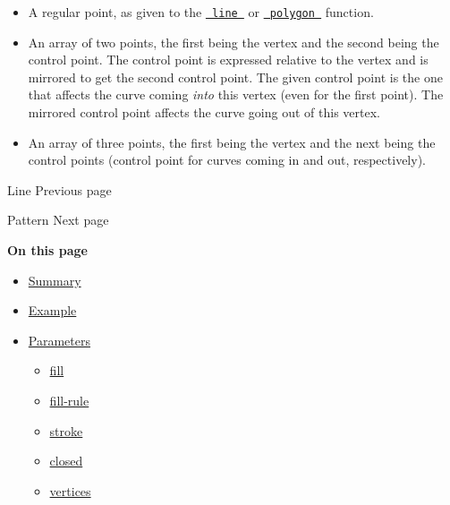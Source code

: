 \begin{itemize}
\tightlist
\item
  A regular point, as given to the
  \href{/docs/reference/visualize/line/}{\texttt{\ line\ }} or
  \href{/docs/reference/visualize/polygon/}{\texttt{\ polygon\ }}
  function.
\item
  An array of two points, the first being the vertex and the second
  being the control point. The control point is expressed relative to
  the vertex and is mirrored to get the second control point. The given
  control point is the one that affects the curve coming \emph{into}
  this vertex (even for the first point). The mirrored control point
  affects the curve going out of this vertex.
\item
  An array of three points, the first being the vertex and the next
  being the control points (control point for curves coming in and out,
  respectively).
\end{itemize}

\href{/docs/reference/visualize/line/}{\pandocbounded{}}

{ Line } { Previous page }

\href{/docs/reference/visualize/pattern/}{\pandocbounded{}}

{ Pattern } { Next page }

\textbf{On this page}

\begin{itemize}
\tightlist
\item
  \hyperref[summary]{Summary}
\item
  \hyperref[example]{Example}
\item
  \hyperref[parameters]{Parameters}

  \begin{itemize}
  \tightlist
  \item
    \hyperref[parameters-fill]{fill}
  \item
    \hyperref[parameters-fill-rule]{fill-rule}
  \item
    \hyperref[parameters-stroke]{stroke}
  \item
    \hyperref[parameters-closed]{closed}
  \item
    \hyperref[parameters-vertices]{vertices}
  \end{itemize}
\end{itemize}

